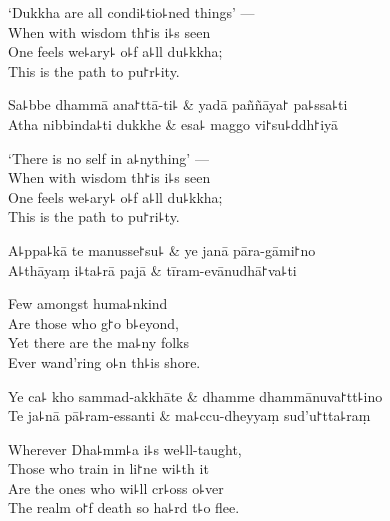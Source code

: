 \begin{english}
  `Dukkha are all condi꜕tio꜕ned things' ---\\
  When with wisdom th꜓is i꜕s seen\\
  One feels we꜕ary꜕ o꜕f a꜕ll du꜕kkha;\\
  This is the path to pu꜓r꜕ity.
\end{english}

\begin{twochants}
  Sa꜕bbe dhammā ana꜓ttā-ti꜕ & yadā paññāya꜓ pa꜕ssa꜕ti \\
  Atha nibbinda꜕ti dukkhe & esa꜕ maggo vi꜓su꜕ddh꜓iyā \\
\end{twochants}

\begin{english}
  `There is no self in a꜕nything' ---\\
  When with wisdom th꜓is i꜕s seen\\
  One feels we꜕ary꜕ o꜕f a꜕ll du꜕kkha;\\
  This is the path to pu꜓ri꜕ty.
\end{english}

\begin{twochants}
  A꜕ppa꜕kā te manusse꜓su꜕ & ye janā pāra-gāmi꜓no \\
  A꜕thāyaṃ i꜕ta꜕rā pajā & tīram-evānudhā꜓va꜕ti \\
\end{twochants}

\begin{english}
  Few amongst huma꜕nkind\\
  Are those who g꜓o b꜕eyond,\\
  Yet there are the ma꜕ny folks\\
  Ever wand'ring o꜕n th꜕is shore.
\end{english}

\begin{twochants}
  Ye ca꜕ kho sammad-akkhāte & dhamme dhammānuva꜓tt꜕ino \\
  Te ja꜕nā pā꜕ram-essanti & ma꜕ccu-dheyyaṃ sud'u꜓tta꜕raṃ \\
\end{twochants}

\begin{english}
  Wherever Dha꜕mm꜕a i꜕s we꜕ll-taught,\\
  Those who train in li꜓ne wi꜕th it\\
  Are the ones who wi꜕ll cr꜕oss o꜕ver\\
  The realm o꜓f death so ha꜕rd t꜕o flee.
\end{english}

